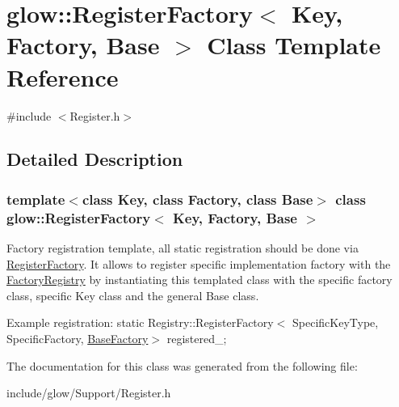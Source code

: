 \hypertarget{classglow_1_1_register_factory}{}\section{glow\+:\+:Register\+Factory$<$ Key, Factory, Base $>$ Class Template Reference}
\label{classglow_1_1_register_factory}


{\ttfamily \#include $<$Register.\+h$>$}



\subsection{Detailed Description}
\subsubsection*{template$<$class Key, class Factory, class Base$>$\newline
class glow\+::\+Register\+Factory$<$ Key, Factory, Base $>$}

Factory registration template, all static registration should be done via \hyperlink{classglow_1_1_register_factory}{Register\+Factory}. It allows to register specific implementation factory with the \hyperlink{classglow_1_1_factory_registry}{Factory\+Registry} by instantiating this templated class with the specific factory class, specific Key class and the general Base class.

Example registration\+: static Registry\+::\+Register\+Factory$<$ Specific\+Key\+Type, Specific\+Factory, \hyperlink{classglow_1_1_base_factory}{Base\+Factory}$>$ registered\+\_\+; 

The documentation for this class was generated from the following file\+:\begin{DoxyCompactItemize}
\item 
include/glow/\+Support/Register.\+h\end{DoxyCompactItemize}
